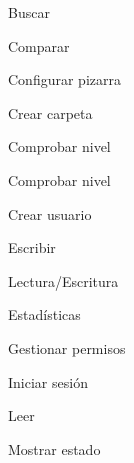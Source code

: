 \begin{figure}[!h]
\centering
\buscar
\caption{Buscar}
\end{figure}
\newpage

\begin{figure}[!h]
\centering
\comparar
\caption{Comparar}
\end{figure}
\newpage

\begin{figure}[!h]
\centering
\configurarPizarra
\caption{Configurar pizarra}
\end{figure}
\newpage

\begin{figure}[!h]
\centering
\crearCarpeta
\caption{Crear carpeta}
\end{figure}
\newpage

\begin{figure}[!h]
\centering
\comprobarNivel
\caption{Comprobar nivel}
\end{figure}
\newpage

\begin{figure}[!h]
\centering
\comprobarNivel
\caption{Comprobar nivel}
\end{figure}
\newpage

\begin{figure}[!h]
\centering
\crearUsuario
\caption{Crear usuario}
\end{figure}
\newpage

\begin{figure}[!h]
\centering
\escribir
\caption{Escribir}
\end{figure}
\newpage

\begin{figure}[!h]
\centering
\lecturaEscritura
\caption{Lectura/Escritura}
\end{figure}
\newpage

\begin{figure}[!h]
\centering
\estadisticas
\caption{Estadísticas}
\end{figure}
\newpage

\begin{figure}[!h]
\centering
\gestionarPermisos
\caption{Gestionar permisos}
\end{figure}
\newpage

\begin{figure}[!h]
\centering
\iniciarSesion
\caption{Iniciar sesión}
\end{figure}
\newpage

\begin{figure}[!h]
\centering
\leer
\caption{Leer}
\end{figure}
\newpage

\begin{figure}[!h]
\centering
\mostrarEstado
\caption{Mostrar estado}
\end{figure}
\newpage

